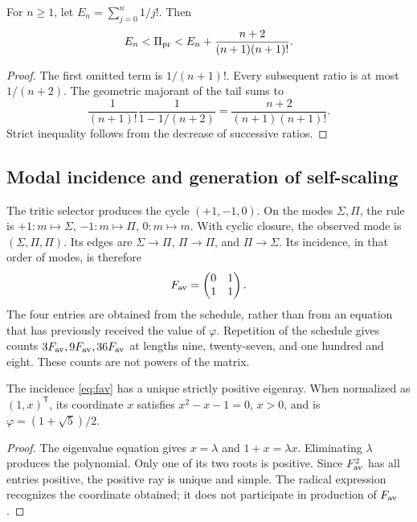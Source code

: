 \begin{proposition}
For \(n\ge1\), let \(E_n=\sum_{j=0}^n1/j!\). Then
\[
 E_n<\Pi_{\rm pr}<E_n+\frac{n+2}{(n+1)(n+1)!}.
\]
\end{proposition}
\begin{proof}
The first omitted term is \(1/(n+1)!\). Every subsequent ratio is at most \(1/(n+2)\). The geometric majorant of the tail sums to
\[
 \frac1{(n+1)!}\frac1{1-1/(n+2)}
 =\frac{n+2}{(n+1)(n+1)!}.
\]
Strict inequality follows from the decrease of successive ratios.
\end{proof}

\subsection{Modal incidence and generation of self-scaling}

The tritic selector produces the cycle \((+1,-1,0)\). On the modes \(\Sigma,\Pi\), the rule is \(+1:m\mapsto\Sigma\), \(-1:m\mapsto\Pi\), \(0:m\mapsto m\). With cyclic closure, the observed mode is \((\Sigma,\Pi,\Pi)\). Its edges are \(\Sigma\to\Pi\), \(\Pi\to\Pi\), and \(\Pi\to\Sigma\). Its incidence, in that order of modes, is therefore
\begin{equation}
 F_{\rm av}=\begin{pmatrix}0&1\\1&1\end{pmatrix}.
 \label{eq:fav}
\end{equation}
The four entries are obtained from the schedule, rather than from an equation that has previously received the value of \(\varphi\). Repetition of the schedule gives counts \(3F_{\rm av},9F_{\rm av},36F_{\rm av}\) at lengths nine, twenty-seven, and one hundred and eight. These counts are not powers of the matrix.

\begin{theorem}
The incidence \eqref{eq:fav} has a unique strictly positive eigenray. When normalized as \((1,x)^{\mathsf T}\), its coordinate \(x\) satisfies \(x^2-x-1=0\), \(x>0\), and is \(\varphi=(1+\sqrt5)/2\).
\end{theorem}
\begin{proof}
The eigenvalue equation gives \(x=\lambda\) and \(1+x=\lambda x\). Eliminating \(\lambda\) produces the polynomial. Only one of its two roots is positive. Since \(F_{\rm av}^2\) has all entries positive, the positive ray is unique and simple. The radical expression recognizes the coordinate obtained; it does not participate in production of \(F_{\rm av}\).
\end{proof}

